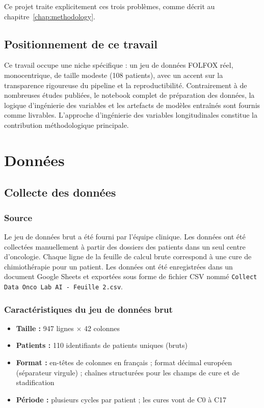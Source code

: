\documentclass[12pt,a4paper]{report}
\begin{document}
Ce projet traite explicitement ces trois problèmes, comme décrit au chapitre~\ref{chap:methodology}.

\section{Positionnement de ce travail}

Ce travail occupe une niche spécifique : un jeu de données FOLFOX réel, monocentrique, de taille modeste (108 patients), avec un accent sur la transparence rigoureuse du pipeline et la reproductibilité. Contrairement à de nombreuses études publiées, le notebook complet de préparation des données, la logique d'ingénierie des variables et les artefacts de modèles entraînés sont fournis comme livrables. L'approche d'ingénierie des variables longitudinales constitue la contribution méthodologique principale.

\chapter{Données}
\label{chap:data}

\section{Collecte des données}

\subsection{Source}
Le jeu de données brut a été fourni par l'équipe clinique. Les données ont été collectées manuellement à partir des dossiers des patients dans un seul centre d'oncologie. Chaque ligne de la feuille de calcul brute correspond à une cure de chimiothérapie pour un patient. Les données ont été enregistrées dans un document Google Sheets et exportées sous forme de fichier CSV nommé \texttt{Collect Data Onco Lab AI - Feuille 2.csv}.

\subsection{Caractéristiques du jeu de données brut}
\begin{itemize}
  \item \textbf{Taille :} 947 lignes $\times$ 42 colonnes
  \item \textbf{Patients :} 110 identifiants de patients uniques (bruts)
  \item \textbf{Format :} en-têtes de colonnes en français ; format décimal européen (séparateur virgule) ; chaînes structurées pour les champs de cure et de stadification
  \item \textbf{Période :} plusieurs cycles par patient ; les cures vont de C0 à C17
\end{itemize}
\end{document}
